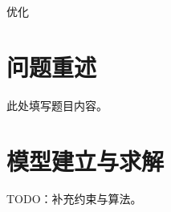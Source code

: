 \documentclass{article}
\begin{document}
\begin{abstract}
本文给出一个尚未完成的方案。
\end{abstract}
\newcommand{\keywords}[1]{#1}
\keywords{优化}
\section{问题重述}
此处填写题目内容。
\section{模型建立与求解}
TODO：补充约束与算法。
\end{document}

